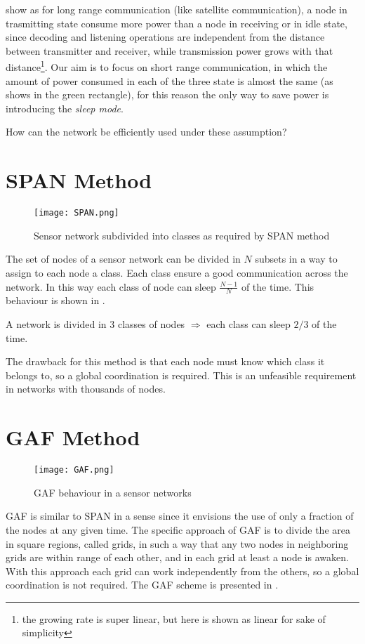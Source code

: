  show as for long range communication (like satellite communication), a node in trasmitting state consume more power than a node in receiving or in idle state, since decoding and listening operations are independent from the distance between transmitter and receiver, while transmission power grows with that distance\footnote{the growing rate is super linear, but here is shown as linear for sake of simplicity}.
Our aim is to focus on short range communication, in which the amount of power consumed in each of the three state is almost the same (as  shows in the green rectangle), for this reason the only way to save power is introducing the \textit{sleep mode}.

How can the network be efficiently used under these assumption?

\section{SPAN Method}
\begin{figure}[h]
	\centering
	\texttt{[image: SPAN.png]}
	\caption{Sensor network subdivided into classes as required by SPAN method}
	\label{fig:SPAN}
\end{figure}

The set of nodes of a sensor network can be divided in $N$ subsets in a way to assign to each node a class.
Each class ensure a good communication across the network.
In this way each class of node can sleep $\frac{N-1}{N}$ of the time.
This behaviour is shown in .

\begin{example}
	A network is divided in 3 classes of nodes $\Rightarrow$ each class can sleep $2/3$ of the time.
\end{example}

The drawback for this method is that each node must know which class it belongs to, so a global coordination is required. This is an unfeasible requirement in networks with thousands of nodes.

\section{GAF Method}
\begin{figure}[h]
	\centering
	\texttt{[image: GAF.png]}
	\caption{GAF behaviour in a sensor networks}
	\label{fig:GAF}
\end{figure}
GAF is similar to SPAN in a sense since it envisions the use of only a fraction of the nodes at any given time. The
specific approach of GAF is to divide the area in square
regions, called grids, in such a way that any two nodes in
neighboring grids are within range of each other, and in each grid at least a node is awaken. With this approach each grid can work independently from the others, so a global coordination is not required. The GAF scheme is presented in .

